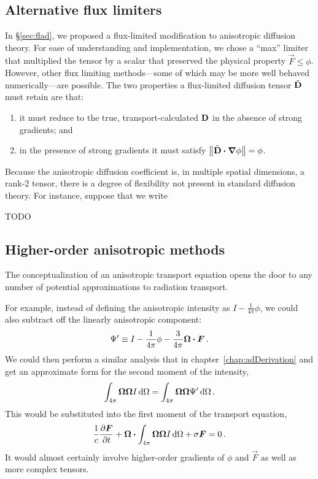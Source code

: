 \subsection{Alternative flux limiters}

In \S\ref{sec:flad}, we proposed a flux-limited modification to anisotropic
diffusion theory. For ease of understanding and implementation, we chose a
``max'' limiter that multiplied the tensor by a scalar that preserved the
physical property $\vec{F} \le \phi$. However, other flux limiting
methods---some of which may be more well behaved numerically---are possible. The
two properties a flux-limited diffusion tensor $\tilde{\mathbf{D}}$ must retain are
that:
\begin{enumerate}
  \item it must reduce to the true, transport-calculated $\mathbf{D}$ in the absence
    of strong gradients; and
  \item in the presence of strong gradients it must satisfy $ \left\| 
    \tilde{\mathbf{D}} \bm{\cdot} \bm{\nabla} \phi \right\| = \phi$.
\end{enumerate}
Because the anisotropic diffusion coefficient is, in multiple spatial
dimensions, a rank-2 tensor, there is a degree of flexibility not present in
standard diffusion theory. For instance, suppose that we write 

TODO

\subsection{Higher-order anisotropic \texorpdfstring{\PN}{PN} methods}
The conceptualization of an anisotropic transport equation opens the door to
any number of potential approximations to radiation transport.

For example, instead of defining the anisotropic intensity as $I -
\frac{1}{4\pi}\phi$, we could also subtract off the linearly anisotropic
component:
\begin{equation*}
  \Psi' \equiv I - \frac{1}{4\pi}\phi - \frac{3}{4\pi} \bm{\Omega} \bm{\cdot}
  \bm{F}\,.
\end{equation*}
We could then perform a similar analysis that in chapter~\ref{chap:adDerivation}
and get an approximate form for the second moment of the intensity,
\begin{equation*}
  \int_{4\pi} \bm{\Omega}\bm{\Omega} I \mathop{}\!\mathrm{d} \Omega
  = \int_{4\pi} \bm{\Omega}\bm{\Omega} \Psi' \mathop{}\!\mathrm{d} \Omega \,.
\end{equation*}
This would be substituted into the first moment of the transport equation,
\begin{equation*}
  \frac{1}{c}\frac{\partial \bm{F}}{\partial t}
  + \bm{\Omega} \bm{\cdot} \int_{4\pi} \bm{\Omega}\bm{\Omega} I \mathop{}\!\mathrm{d} \Omega
  + \sigma \bm{F}
  = 0 \,.
\end{equation*}
It would almost certainly involve higher-order gradients of $\phi$ and $\vec{F}$
as well as more complex tensors.

